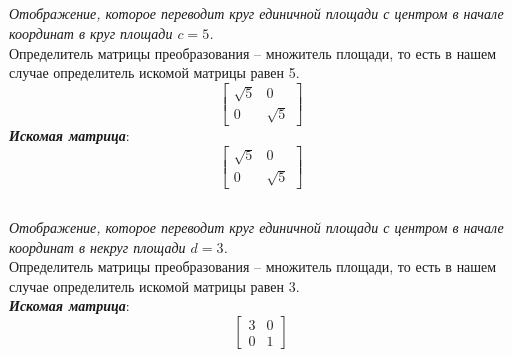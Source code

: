 \documentclass[a5paper, 10pt]{article}
\theoremstyle{definition}
\theoremstyle{plain}
\theoremstyle{remark}
\begin{document}
\subsection{}
\textit{Отображение, которое переводит круг единичной площади с центром в начале координат в круг площади $c=5$.}\\
Определитель матрицы преобразования -- множитель площади, то есть в нашем случае определитель искомой матрицы равен 5. \\
\begin{equation}
\begin{bmatrix}
\sqrt{5} & 0\\
0 & \sqrt{5}
\end{bmatrix}
\end{equation}
\textit{\textbf{Искомая матрица}}:
\begin{equation}
\begin{bmatrix}
\sqrt{5} & 0\\
0 & \sqrt{5}
\end{bmatrix}
\end{equation}


\subsection{}
\textit{Отображение, которое переводит круг единичной площади с центром в начале координат в некруг площади $d=3$.}\\
Определитель матрицы преобразования -- множитель площади, то есть в нашем случае определитель искомой матрицы равен 3. \\
\textit{\textbf{Искомая матрица}}:
\begin{equation}
\begin{bmatrix}
3 & 0\\
0 & 1
\end{bmatrix}
\end{equation}
\end{document}
